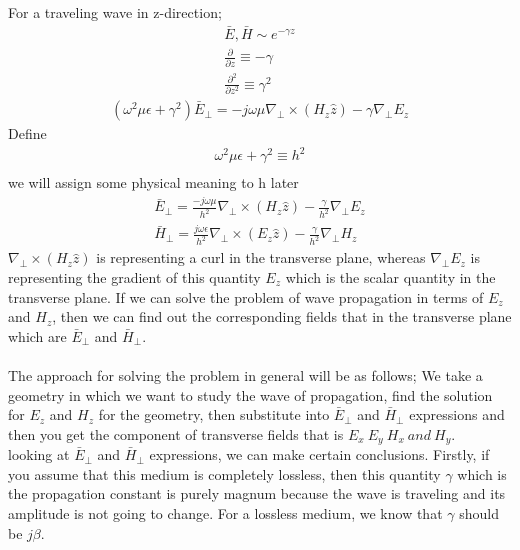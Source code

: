 For a traveling wave in z-direction;
\begin{align*}
\bar{E}, \bar{H} \sim e^{-\gamma z}\\
\frac{\partial}{\partial z} \equiv -\gamma\\
\frac{\partial^2}{\partial z^2} \equiv \gamma^2
\end{align*}
\begin{align*}
(\omega^2\mu\epsilon + \gamma^2)\bar{E}_\bot = -j\omega\mu\nabla_\bot\times(H_z\hat{z})-\gamma\nabla_\bot E_z
\end{align*}
Define
\begin{align*}
\omega^2\mu\epsilon + \gamma^2 \equiv h^2\\
\end{align*}
we will assign some physical meaning to h later
\begin{align*}
\bar{E}_\bot = \frac{-j\omega\mu}{h^2}\nabla_\bot\times(H_z\hat{z}) - \frac{\gamma}{h^2}\nabla_\bot E_z\\
\bar{H}_\bot = \frac{j\omega\epsilon}{h^2}\nabla_\bot\times(E_z\hat{z}) - \frac{\gamma}{h^2}\nabla_\bot H_z
\end{align*}
$\nabla_\bot\times(H_z\hat{z})$ is representing a curl in the transverse plane, whereas $\nabla_\bot E_z$ is representing the gradient of this quantity $E_z$ which is the scalar quantity in the transverse plane. If we can solve the problem of wave propagation in terms of $E_z$ and $H_z$, then we can find out the corresponding fields that in the transverse plane which are $\bar{E}_\bot$ and $\bar{H}_\bot$.\\
\\

The approach for solving the problem in general will be as follows; We take a geometry in which we want to study the wave of propagation, find the solution for $E_z$ and $H_z$ for the geometry, then substitute into $\bar{E}_\bot$ and $\bar{H}_\bot$ expressions and then you get the component of transverse fields that is $E_x\ E_y\ H_x\ and\ H_y$.\\looking at $\bar{E}_\bot$ and $\bar{H}_\bot$ expressions, we can make certain conclusions. Firstly, if you assume that this medium is completely lossless, then this quantity $\gamma$ which is the propagation constant is purely magnum because the wave is traveling and its amplitude is not going to change. For a lossless medium, we know that $\gamma$ should be $j\beta$.
